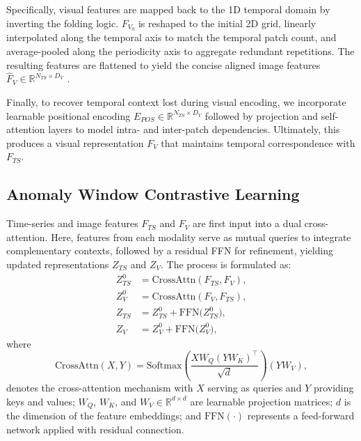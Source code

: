 \documentclass{article}
\theoremstyle{plain}
\theoremstyle{definition}
\theoremstyle{remark}
\newcommand{\chen}[1]{{\color{red}{\bf{Chen says:}} \emph{#1}}}
\begin{document}
Specifically, visual features are mapped back to the 1D temporal domain by inverting the folding logic. $F_{V_0}$ is reshaped to the initial 2D grid, linearly interpolated along the temporal axis to match the temporal patch count, and average-pooled along the periodicity axis to aggregate redundant repetitions. The resulting features are flattened to yield the concise aligned image features $\hat{F}_{V} \in \mathbb{R}^{N_{TS} \times D_V}$ .

Finally, to recover temporal context lost during visual encoding, we incorporate learnable positional encoding $E_{POS} \in \mathbb{R}^{N_{TS} \times D_V} $ followed by projection and self-attention layers to model intra- and inter-patch dependencies. Ultimately, this produces a visual representation $F_{V}$ that maintains temporal correspondence with $F_{TS}$.
\vspace{-0.5em}
\subsection{Anomaly Window Contrastive Learning}

Time-series and image features $F_{TS}$ and $F_{V}$ are first input into a dual cross-attention. Here, features from each modality serve as mutual queries to integrate complementary contexts, followed by a residual FFN for refinement, yielding updated representations $Z_{TS}$ and $Z_V$. The process is formulated as:
\begin{equation}
\begin{aligned}
    Z_{TS}^{0} &= \text{CrossAttn}(F_{TS}, F_V), \\
    Z_V^{0}    &= \text{CrossAttn}(F_V, F_{TS}), \\
    Z_{TS}       &= Z_{TS}^{0} + \text{FFN}\big(Z_{TS}^{0}\big),\\
    Z_V          &= Z_V^{0} + \text{FFN}\big(Z_V^{0}\big),
\end{aligned}
\end{equation}
where 
\begin{equation}
    \text{CrossAttn}(X, Y) = \text{Softmax}\left( \frac{X W_Q (Y W_K)^\top}{\sqrt{d}} \right) (Y W_V),
\end{equation}
denotes the cross-attention mechanism with $X$ serving as queries and $Y$ providing keys and values;  
$W_Q$, $W_K$, and $W_V \in \mathbb{R}^{d \times d}$ are learnable projection matrices;  
$d$ is the  dimension of the feature embeddings;  
and $\text{FFN}(\cdot)$ represents a feed-forward network applied with residual connection.
\end{document}
